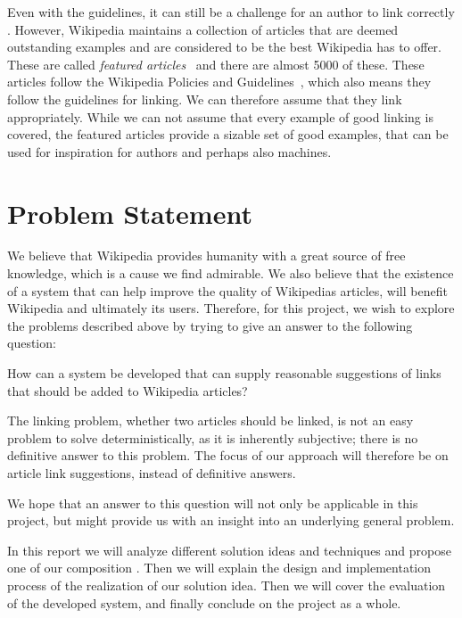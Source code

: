 Even with the guidelines, it can still be a challenge for an author to link correctly . However, Wikipedia maintains a collection of articles that are deemed outstanding examples and are considered to be the best Wikipedia has to offer. These are called \emph{featured articles}~\cite{wiki-featured-articles} and there are almost 5000 of these. These articles follow the Wikipedia Policies and Guidelines~\cite{wiki-editor-guidelines}, which also means they follow the guidelines for linking. We can therefore assume that they link appropriately. While we can not assume that every example of good linking is covered, the featured articles provide a sizable set of good examples, that can be used for inspiration for authors and perhaps also machines.

\section{Problem Statement}\label{sec:problem_statement}

We believe that Wikipedia provides humanity with a great source of free knowledge, which is a cause we find admirable. We also believe that the existence of a system that can help improve the quality of Wikipedias articles, will benefit Wikipedia and ultimately its users. Therefore, for this project, we wish to explore the problems described above by trying to give an answer to the following question:

\begin{formal}
How can a system be developed that can supply reasonable suggestions of links that should be added to Wikipedia articles?
\end{formal}

The linking problem, whether two articles should be linked, is not an easy problem to solve deterministically, as it is inherently subjective; there is no definitive answer to this problem. The focus of our approach will therefore be on article link suggestions, instead of definitive answers. %

We hope that an answer to this question will not only be applicable in this project, but might provide us with an insight into an underlying general problem.

In this report we will analyze different solution ideas and techniques and propose one of our composition . Then we will explain the design and implementation process of the realization of our solution idea. Then we will cover the evaluation of the developed system, and finally conclude on the project as a whole.







